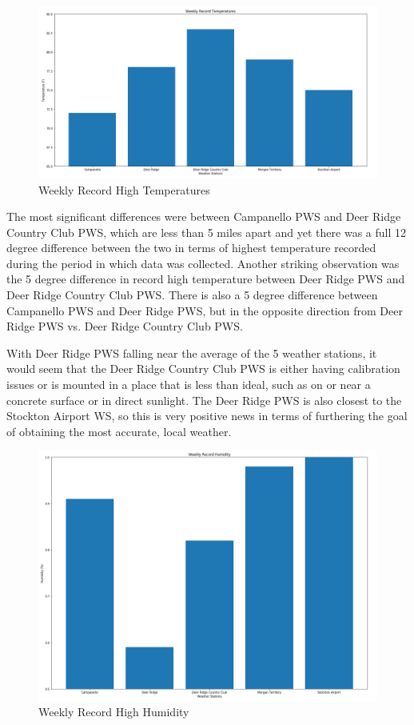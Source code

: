 \documentclass[sigconf]{acmart}
\begin{document}
\begin{figure}[H]
    \centering
    \includegraphics[scale=.30]{WK_REC_TEMP.PNG}
    \caption{Weekly Record High Temperatures}
\end{figure}

The most significant differences were between Campanello PWS and Deer Ridge Country Club PWS, which are less than 5 miles apart and yet there was a full 12 degree difference between the two in terms of highest temperature recorded during the period in which data was collected. Another striking observation was the 5 degree difference in record high temperature between Deer Ridge PWS and Deer Ridge Country Club PWS. There is also a 5 degree difference between Campanello PWS and Deer Ridge PWS, but in the opposite direction from Deer Ridge PWS vs. Deer Ridge Country Club PWS. 

With Deer Ridge PWS falling near the average of the 5 weather stations, it would seem that the Deer Ridge Country Club PWS is either having calibration issues or is mounted in a place that is less than ideal, such as on or near a concrete surface or in direct sunlight. The Deer Ridge PWS is also closest to the Stockton Airport WS, so this is very positive news in terms of furthering the goal of obtaining the most accurate, local weather.

\begin{figure}[H]
    \centering
    \includegraphics[scale=.30]{WK_REC_HUM.PNG}
    \caption{Weekly Record High Humidity}
\end{figure}
\end{document}
